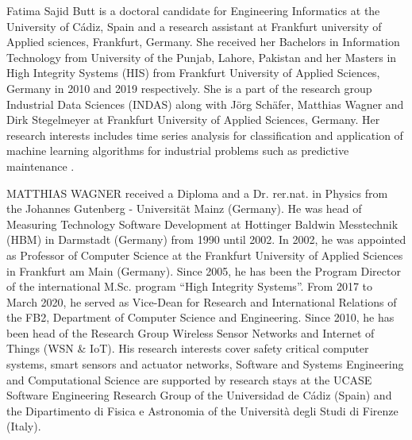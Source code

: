 \documentclass{ieeeaccess}
\begin{document}
\begin{IEEEbiography}
{Fatima Sajid Butt} is a doctoral candidate for Engineering Informatics at the University of Cádiz, Spain and a research assistant at Frankfurt university of Applied sciences, Frankfurt, Germany. She received her Bachelors in Information Technology from University of the Punjab, Lahore, Pakistan and her Masters in High Integrity Systems (HIS) from Frankfurt University of Applied Sciences, Germany in 2010 and 2019 respectively. 
She is a part of the research group Industrial Data Sciences (INDAS) along with Jörg Schäfer, Matthias Wagner and Dirk Stegelmeyer at Frankfurt University of Applied Sciences, Germany. Her research interests includes time series analysis for classification and application of machine learning algorithms for industrial problems such as predictive maintenance . 
\end{IEEEbiography}

\begin{IEEEbiography}
{MATTHIAS WAGNER} received a Diploma and a Dr. rer.nat. in Physics from the Johannes Gutenberg - Universität Mainz (Germany). He was head of Measuring Technology Software Development at Hottinger Baldwin Messtechnik (HBM) in Darmstadt (Germany) from 1990 until 2002. In 2002, he was appointed as Professor of Computer Science at the Frankfurt University of Applied Sciences in Frankfurt am Main (Germany). Since 2005, he has been the Program Director of the international M.Sc. program “High Integrity Systems”. From 2017 to March 2020, he served as Vice-Dean for Research and International Relations of the FB2, Department of Computer Science and Engineering. Since 2010, he has been head of the Research Group Wireless Sensor Networks and Internet of Things (WSN \& IoT). His research interests cover safety critical computer systems, smart sensors and actuator networks, Software and Systems Engineering and Computational Science are supported by research stays at the UCASE Software Engineering Research Group of the Universidad de Cádiz (Spain) and the Dipartimento di Fisica e Astronomia of the Università degli Studi di Firenze (Italy). 
\end{IEEEbiography}
\end{document}
